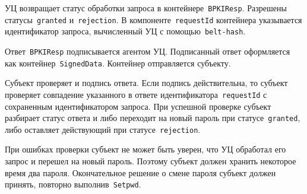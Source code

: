 УЦ возвращает статус обработки запроса в контейнере~\texttt{BPKIResp}.
Разрешены статусы~\texttt{granted} и~\texttt{rejection}.
В компоненте~\texttt{requestId} контейнера указывается идентификатор 
запроса, вычисленный УЦ с помощью~\texttt{belt-hash}.

Ответ~\texttt{BPKIResp} подписывается агентом УЦ. 
Подписанный ответ оформляется как контейнер~\texttt{SignedData}. Контейнер 
отправляется субъекту.

Субъект проверяет  и подпись ответа. Если подпись 
действительна, то субъект проверяет совпадение указанного в ответе 
идентификатора~\texttt{requestId} с сохраненным идентификатором запроса. 
При успешной проверке субъект разбирает статус ответа и либо переходит 
на новый пароль при статусе~\texttt{granted}, либо оставляет действующий
при статусе~\texttt{rejection}. 

При ошибках проверки субъект не может быть уверен, что УЦ обработал
его запрос и перешел на новый пароль. Поэтому субъект должен хранить  
некоторое время два пароля. Окончательное решение о смене пароля 
субъект должен принять, повторно выполнив~\texttt{Setpwd}.
